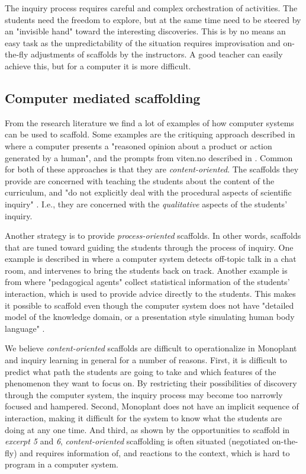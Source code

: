 The inquiry process requires careful and complex orchestration of activities. The students need the freedom to explore, but at the same time need to be steered by an "invisible hand" toward the interesting discoveries. This is by no means an easy task as the unpredictability of the situation requires improvisation and on-the-fly adjustments of scaffolds by the instructors. A good teacher can easily achieve this, but for a computer it is more difficult. 

\subsection{Computer mediated scaffolding}
From the research literature we find a lot of examples of how computer systems can be used to scaffold. Some examples are the critiquing approach described in \citet{fischer1991critics} where a computer presents a "reasoned opinion about a product or action generated by a human", and the prompts from viten.no described in \citep{furberg2009socio}. Common for both of these approaches is that they are \emph{content-oriented}. The scaffolds they provide are concerned with teaching the students about the content of the curriculum, and "do not explicitly deal with the procedural aspects of scientific inquiry" \citep{furberg2009socio}. I.e., they are concerned with the \emph{qualitative} aspects of the students' inquiry. 

Another strategy is to provide \emph{process-oriented} scaffolds. In other words, scaffolds that are tuned toward guiding the students through the process of inquiry. One example is described in \citet{soller2005mirroring} where a computer system detects off-topic talk in a chat room, and intervenes to bring the students back on track. Another example is from \citet{morch2003integrating} where "pedagogical agents" collect statistical information of the students' interaction, which is used to provide advice directly to the students. This makes it possible to scaffold even though the computer system does not have "detailed model of the knowledge domain, or a presentation style simulating human body language" \citep{morch2003integrating}. 

We believe \emph{content-oriented} scaffolds are difficult to operationalize in Monoplant and inquiry learning in general for a number of reasons. First, it is difficult to predict what path the students are going to take and which features of the phenomenon they want to focus on. By restricting their possibilities of discovery through the computer system, the inquiry process may become too narrowly focused and hampered. Second, Monoplant does not have an implicit sequence of interaction, making it difficult for the system to know what the students are doing at any one time. And third, as shown by the opportunities to scaffold in \emph{excerpt 5} and \emph{6}, \emph{content-oriented} scaffolding is often situated (negotiated on-the-fly) and requires information of, and reactions to the context, which is hard to program in a computer system. 

